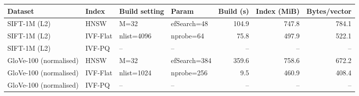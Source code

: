 \begin{tabular}{llllrrr}
\toprule
Dataset & Index & Build setting & Param & Build (s) & Index (MiB) & Bytes/vector \\
\midrule
SIFT-1M (L2) & HNSW & M=32 & efSearch=48 & 104.9 & 747.8 & 784.1 \\
SIFT-1M (L2) & IVF-Flat & nlist=4096 & nprobe=64 & 75.8 & 497.9 & 522.1 \\
SIFT-1M (L2) & IVF-PQ & -- & -- & -- & -- & -- \\
GloVe-100 (normalised) & HNSW & M=32 & efSearch=384 & 359.6 & 758.6 & 672.2 \\
GloVe-100 (normalised) & IVF-Flat & nlist=1024 & nprobe=256 & 9.5 & 460.9 & 408.4 \\
GloVe-100 (normalised) & IVF-PQ & -- & -- & -- & -- & -- \\
\bottomrule
\end{tabular}
